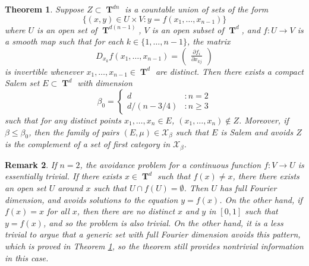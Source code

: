 \documentclass[12pt,reqno]{article}
\numberwithin{equation}{section}
\DeclareMathOperator{\TT}{\mathbf{T}}
\newtheorem{theorem}{Theorem}
\newtheorem{remark}[theorem]{Remark}
\numberwithin{theorem}{section}
\begin{document}
\begin{theorem} \label{theoremJOICVIOJVI122}
    Suppose $Z \subset \TT^{dn}$ is a countable union of sets of the form
    \[ \{ (x,y) \in U \times V : y = f(x_1,\dots,x_{n-1}) \} \]
    where $U$ is an open set of $\TT^{d(n-1)}$, $V$ is an open subset of $\TT^d$, and $f: U \to V$ is a smooth map such that for each $k \in \{ 1, \dots, n-1 \}$, the matrix
    \[ D_{x_k} f(x_1,\dots,x_{n-1}) = \begin{pmatrix} \frac{\partial f_i}{\partial x_{kj}} \end{pmatrix} \]
    is invertible whenever $x_1,\dots,x_{n-1} \in \TT^d$ are distinct. Then there exists a compact Salem set $E \subset \TT^d$ with dimension
    \[ \beta_0 = \begin{cases} d &: n = 2 \\ d/(n - 3/4) &: n \geq 3 \end{cases} \]
    such that for any distinct points $x_1, \dots, x_n \in E$, $(x_1, \dots, x_n) \not \in Z$. Moreover, if $\beta \leq \beta_0$, then the family of pairs $(E,\mu) \in \mathcal{X}_\beta$ such that $E$ is Salem and avoids $Z$ is the complement of a set of first category in $\mathcal{X}_\beta$.
\end{theorem}

\begin{remark}
    If $n = 2$, the avoidance problem for a continuous function $f: V \to U$ is essentially trivial. If there exists $x \in \TT^d$ such that $f(x) \neq x$, there there exists an open set $U$ around $x$ such that $U \cap f(U) = \emptyset$. Then $U$ has full Fourier dimension, and avoids solutions to the equation $y = f(x)$. On the other hand, if $f(x) = x$ for all $x$, then there are no distinct $x$ and $y$ in $[0,1]$ such that $y = f(x)$, and so the problem is also trivial. On the other hand, it is a less trivial to argue that a \emph{generic} set with full Fourier dimension avoids this pattern, which is proved in Theorem \ref{theoremJOICVIOJVI122}, so the theorem still provides nontrivial information in this case.
\end{remark}
\end{document}
